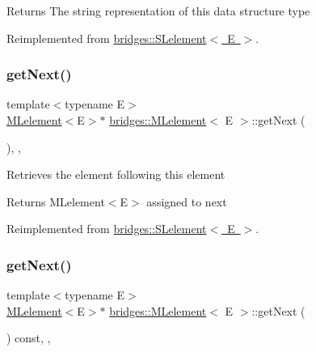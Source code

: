 \begin{DoxyReturn}{Returns}
The string representation of this data structure type 
\end{DoxyReturn}


Reimplemented from \mbox{\hyperlink{classbridges_1_1_s_lelement_a136330b3481a47b3edb429f323274655}{bridges\+::\+S\+Lelement$<$ E $>$}}.

\mbox{\label{classbridges_1_1_m_lelement_aceebd292e7d497f44eea5c4845e7709f}} 
\subsubsection{\texorpdfstring{get\+Next()}{getNext()}\hspace{0.1cm}{\footnotesize\ttfamily [1/2]}}
{\footnotesize\ttfamily template$<$typename E$>$ \\
\mbox{\hyperlink{classbridges_1_1_m_lelement}{M\+Lelement}}$<$E$>$$\ast$ \mbox{\hyperlink{classbridges_1_1_m_lelement}{bridges\+::\+M\+Lelement}}$<$ E $>$\+::get\+Next (\begin{DoxyParamCaption}{ }\end{DoxyParamCaption})\hspace{0.3cm}{\ttfamily [inline]}, {\ttfamily [override]}, {\ttfamily [virtual]}}

Retrieves the element following this element

\begin{DoxyReturn}{Returns}
M\+Lelement$<$\+E$>$ assigned to next 
\end{DoxyReturn}


Reimplemented from \mbox{\hyperlink{classbridges_1_1_s_lelement_a5bd74108a9aa49339378bf62cdbb19ca}{bridges\+::\+S\+Lelement$<$ E $>$}}.

\mbox{\label{classbridges_1_1_m_lelement_aef3e5750e334331597bce94710745d1e}} 
\subsubsection{\texorpdfstring{get\+Next()}{getNext()}\hspace{0.1cm}{\footnotesize\ttfamily [2/2]}}
{\footnotesize\ttfamily template$<$typename E$>$ \\
\mbox{\hyperlink{classbridges_1_1_m_lelement}{M\+Lelement}}$<$E$>$$\ast$ \mbox{\hyperlink{classbridges_1_1_m_lelement}{bridges\+::\+M\+Lelement}}$<$ E $>$\+::get\+Next (\begin{DoxyParamCaption}{ }\end{DoxyParamCaption}) const\hspace{0.3cm}{\ttfamily [inline]}, {\ttfamily [override]}, {\ttfamily [virtual]}}

